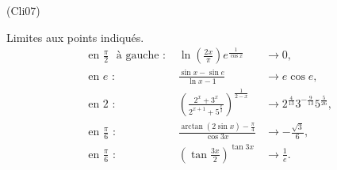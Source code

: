 \begin{tiny}(Cli07)\end{tiny} Limites aux points indiqués.
\begin{align*}
&\text{en }\frac{\pi }{2}\text{ {\`a} gauche : } &\ln \left( \frac{2x}{\pi }\right) e^{\frac{1}{\cos x}} &\rightarrow 0, \\
&\text{en }e\text{ : } &\frac{\sin x-\sin e}{\ln x-1} &\rightarrow e \cos e, \\
&\text{en }2\text{ : } &\left( \frac{2^{x}+3^{x}}{2^{x+1}+5^{\frac{x}{2}}}\right)^{\frac{1}{2-x}} &\rightarrow 2^{\frac{4}{13}} 3^{-\frac{9}{13}}5^{\frac{5}{26}}, \\
&\text{en }\frac{\pi }{6}\text{ : } &\frac{\arctan (2\sin x)-\frac{\pi }{4}}{\cos 3x} &\rightarrow -\frac{\sqrt{3}}{6}, \\
&\text{en }\frac{\pi }{6}\text{ : } &\left( \tan \frac{3x}{2}\right)^{\tan 3x} &\rightarrow \frac{1}{e}.
\end{align*}

